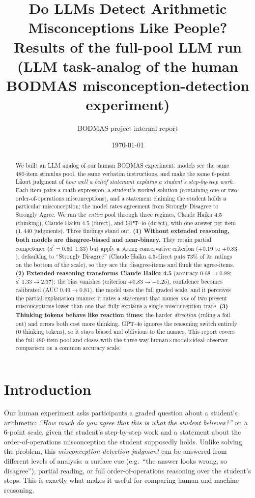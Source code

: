 \documentclass[11pt]{article}
\title{\textbf{Do LLMs Detect Arithmetic Misconceptions Like People?}\\
\large Results of the full-pool LLM run (LLM task-analog of the human BODMAS
misconception-detection experiment)}
\author{BODMAS project internal report}
\date{\today}
\newcommand{\dprime}{d^{\prime}}
\newcommand{\haiku}{Claude Haiku 4.5}
\newcommand{\gpt}{GPT-4o}
\begin{document}
\maketitle

\begin{abstract}
\noindent
We built an LLM analog of our human BODMAS experiment: models see the same 480-item
stimulus pool, the same verbatim instructions, and make the same 6-point Likert judgment of
\emph{how well a belief statement explains a student's step-by-step work}. Each item pairs a
math expression, a student's worked solution (containing one or two order-of-operations
misconceptions), and a statement claiming the student holds a particular misconception; the
model rates agreement from Strongly Disagree to Strongly Agree. We ran the \emph{entire} pool
through three regimes, \haiku{} (thinking), \haiku{} (direct), and \gpt{} (direct), with
one answer per item ($1{,}440$ judgments). Three findings stand out. \textbf{(1) Without extended
reasoning, both models are disagree-biased and near-binary.} They retain partial competence
($\dprime = 0.60$--$1.33$) but apply a strong conservative criterion ($+0.19$ to $+0.83$),
defaulting to ``Strongly Disagree'' (\haiku{}-direct puts $73\%$ of its ratings on the
bottom of the scale), so they ace the disagree-items and flunk the agree-items.
\textbf{(2) Extended reasoning transforms \haiku{}} (accuracy $0.68 \to 0.88$; $\dprime\ 1.33
\to 2.37$): the bias vanishes (criterion $+0.83 \to -0.25$), confidence becomes calibrated
(AUC $0.49 \to 0.81$), the model uses the full graded scale, and it perceives the
partial-explanation nuance: it rates a statement that names \emph{one} of two present
misconceptions lower than one that fully explains a single-misconception trace.
\textbf{(3) Thinking tokens behave like reaction times}: the harder \emph{direction} (ruling a
foil out) and errors both cost more thinking. \gpt{} ignores the reasoning switch entirely
($0$ thinking tokens), so it stays biased and oblivious to the nuance. This report covers the
full 480-item pool and closes with the three-way human$\times$model$\times$ideal-observer
comparison on a common accuracy scale.
\end{abstract}

\section{Introduction}

Our human experiment asks participants a graded question about a student's arithmetic:
\emph{``How much do you agree that this is what the student believes?''} on a 6-point scale,
given the student's step-by-step work and a statement about the order-of-operations
misconception the student supposedly holds. Unlike solving the problem, this
\emph{misconception-detection judgment} can be answered from different levels of analysis:
a surface cue (e.g.\ ``the answer looks wrong, so disagree''), partial reading, or full
order-of-operations reasoning over the student's steps. This is exactly what makes it
useful for comparing human and machine reasoning.
\end{document}
